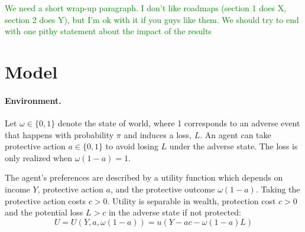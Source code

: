 \documentclass[12pt,a4paper]{article}
\begin{document}

\textcolor{green}{We need a short wrap-up paragraph.  I don't like roadmaps (section 1 does X, section 2 does Y), but I'm ok with it if you guys like them.  We should try to end with one pithy statement about the impact of the results}

\vspace{20pt}
\section{Model}
\paragraph{Environment.} Let $\omega \in \{0,1\}$ denote the state of world, where 1 corresponds to an adverse event that happens with probability $\pi$ and induces a loss, $L$. An agent can take protective action $a\in\{0,1\}$ to avoid losing $L$ under the adverse state. The loss is only realized when $\omega(1-a)=1$.

The agent's preferences are described by a utility function which depends on income $Y$, protective action $a$, and the protective outcome $\omega(1-a)$. Taking the protective action costs $c>0$. Utility is separable in wealth, protection cost $c>0$ and the potential loss $L>c$ in the adverse state if not protected:
\[
U=U(Y,a,\omega(1-a))=u(Y-ac-\omega(1-a)L)
\]
\end{document}
